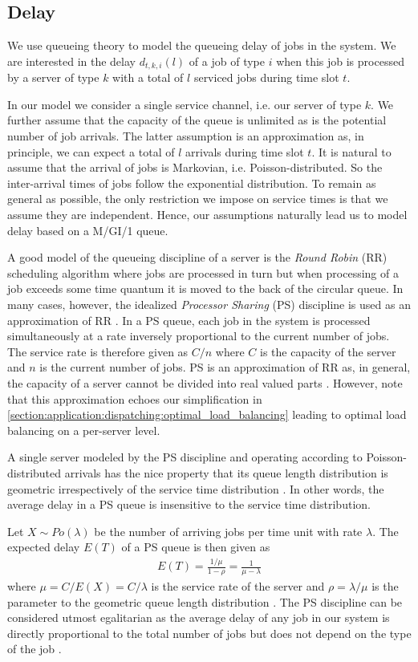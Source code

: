 \subsection{Delay}

We use queueing theory to model the queueing delay of jobs in the system. We are interested in the delay $d_{t,k,i}(l)$ of a job of type $i$ when this job is processed by a server of type $k$ with a total of $l$ serviced jobs during time slot $t$.

In our model we consider a single service channel, i.e. our server of type $k$. We further assume that the capacity of the queue is unlimited as is the potential number of job arrivals. The latter assumption is an approximation as, in principle, we can expect a total of $l$ arrivals during time slot $t$. It is natural to assume that the arrival of jobs is Markovian, i.e. Poisson-distributed. So the inter-arrival times of jobs follow the exponential distribution. To remain as general as possible, the only restriction we impose on service times is that we assume they are independent. Hence, our assumptions naturally lead us to model delay based on a M/GI/1 queue.

A good model of the queueing discipline of a server is the \textit{Round Robin} (RR) scheduling algorithm where jobs are processed in turn but when processing of a job exceeds some time quantum it is moved to the back of the circular queue. In many cases, however, the idealized \textit{Processor Sharing} (PS) discipline is used as an approximation of RR \cite{Lin2011, Lin2012}. In a PS queue, each job in the system is processed simultaneously at a rate inversely proportional to the current number of jobs. The service rate is therefore given as $C / n$ where $C$ is the capacity of the server and $n$ is the current number of jobs. PS is an approximation of RR as, in general, the capacity of a server cannot be divided into real valued parts \cite{Virtamo2007}. However, note that this approximation echoes our simplification in \autoref{section:application:dispatching:optimal_load_balancing} leading to optimal load balancing on a per-server level.

A single server modeled by the PS discipline and operating according to Poisson-distributed arrivals has the nice property that its queue length distribution is geometric irrespectively of the service time distribution \cite{Aalto2007}. In other words, the average delay in a PS queue is insensitive to the service time distribution.

Let $X \sim Po(\lambda)$ be the number of arriving jobs per time unit with rate $\lambda$. The expected delay $E(T)$ of a PS queue is then given as \begin{align*}
    E(T) = \frac{1/\mu}{1-\rho} = \frac{1}{\mu - \lambda}
\end{align*} where $\mu = C / E(X) = C / \lambda$ is the service rate of the server and $\rho = \lambda / \mu$ is the parameter to the geometric queue length distribution \cite{Virtamo2007}. The PS discipline can be considered utmost egalitarian as the average delay of any job in our system is directly proportional to the total number of jobs but does not depend on the type of the job \cite{Virtamo2007}.

